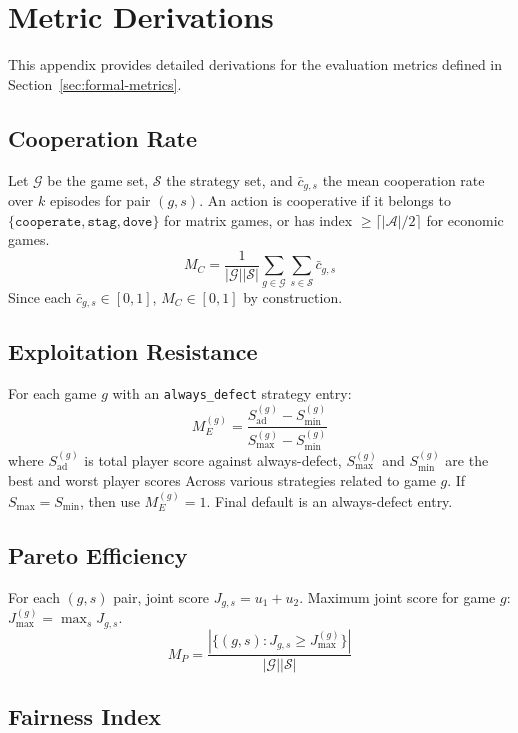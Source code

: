 
\section{Metric Derivations}
\label{app:metrics}

This appendix provides detailed derivations for the evaluation metrics
defined in Section~\ref{sec:formal-metrics}.

\subsection{Cooperation Rate}

Let $\mathcal{G}$ be the game set, $\mathcal{S}$ the strategy set, and
$\bar{c}_{g,s}$ the mean cooperation rate over $k$ episodes for pair $(g,s)$.
An action is cooperative if it belongs to
$\{\texttt{cooperate}, \texttt{stag}, \texttt{dove}\}$ for matrix games,
or has index $\geq \lceil |\mathcal{A}|/2 \rceil$ for economic games.
\[
M_C = \frac{1}{|\mathcal{G}||\mathcal{S}|} \sum_{g \in \mathcal{G}}
  \sum_{s \in \mathcal{S}} \bar{c}_{g,s}
\]
Since each $\bar{c}_{g,s} \in [0,1]$, $M_C \in [0,1]$ by construction.

\subsection{Exploitation Resistance}

For each game $g$ with an \texttt{always\_defect} strategy entry:
\[
M_E^{(g)} = \frac{S_{\text{ad}}^{(g)} - S_{\min}^{(g)}}
  {S_{\max}^{(g)} - S_{\min}^{(g)}}
\]
where $S_{\text{ad}}^{(g)}$ is total player score against always-defect,
$S_{\max}^{(g)}$ and $S_{\min}^{(g)}$ are the best and worst player scores
Across various strategies related to game $g$. If $S_{\max} = S_{\min}$, then use $M_E^{(g)} = 1$. Final default is
an always-defect entry.

\subsection{Pareto Efficiency}

For each $(g,s)$ pair, joint score $J_{g,s} = u_1 + u_2$. Maximum joint
score for game $g$: $J_{\max}^{(g)} = \max_s J_{g,s}$.
\[
M_P = \frac{|\{(g,s) : J_{g,s} \geq J_{\max}^{(g)}\}|}{|\mathcal{G}||\mathcal{S}|}
\]

\subsection{Fairness Index}

